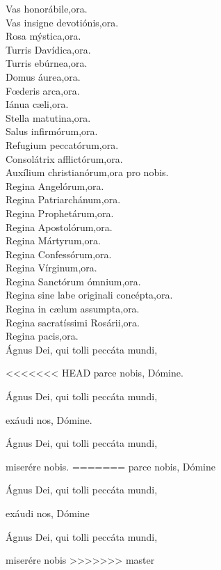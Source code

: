 Vas honorábile,\hfill ora.\\
Vas insigne devotiónis,\hfill ora.\\
Rosa mýstica,\hfill ora.\\
Turris Davídica,\hfill ora.\\
Turris ebúrnea,\hfill ora.\\
Domus áurea,\hfill ora.\\
F{\oe}deris arca,\hfill ora.\\
Iánua c{\ae}li,\hfill ora.\\
Stella matutina,\hfill ora.\\
Salus infirmórum,\hfill ora.\\
Refugium peccatórum,\hfill ora.\\
Consolátrix afflictórum,\hfill ora.\\
Auxílium christianórum,\hfill ora pro nobis.\\
Regina Angelórum,\hfill ora.\\
Regina Patriarchánum,\hfill ora.\\
Regina Prophetárum,\hfill ora.\\
Regina Apostolórum,\hfill ora.\\
Regina Mártyrum,\hfill ora.\\
Regina Confessórum,\hfill ora.\\
Regina Vírginum,\hfill ora.\\
Regina Sanctórum ómnium,\hfill ora.\\
Regina sine labe originali concépta,\hfill ora.\\
Regina in c{\ae}lum assumpta,\hfill ora.\\
Regina sacratíssimi Rosárii,\hfill ora.\\
Regina pacis,\hfill ora.\\
Ágnus Dei, qui tolli peccáta mundi,

<<<<<<< HEAD
\hfill parce nobis, Dómine.

Ágnus Dei, qui tolli peccáta mundi, 

\hfill exáudi nos, Dómine.

Ágnus Dei, qui tolli peccáta mundi, 

\hfill miserére nobis.
=======
{\hfill}parce nobis, Dómine  

Ágnus Dei, qui tolli peccáta mundi, 

{\hfill}exáudi nos, Dómine

Ágnus Dei, qui tolli peccáta mundi, 

{\hfill}miserére nobis
>>>>>>> master
